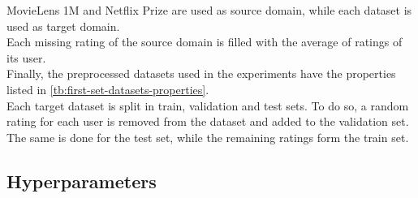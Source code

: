 MovieLens 1M and Netflix Prize are used as source domain, while each dataset is used as target domain.\\
Each missing rating of the source domain is filled with the average of ratings of its user.\\
Finally, the preprocessed datasets used in the experiments have the properties listed in \autoref{tb:first-set-datasets-properties}.\\
Each target dataset is split in train, validation and test sets. To do so, a random rating for each user is removed from the dataset and added to the validation set. The same is done for the test set, while the remaining ratings form the train set.


\subsection{Hyperparameters}
\label{ss:first-set-datasets-hyperparameters}

